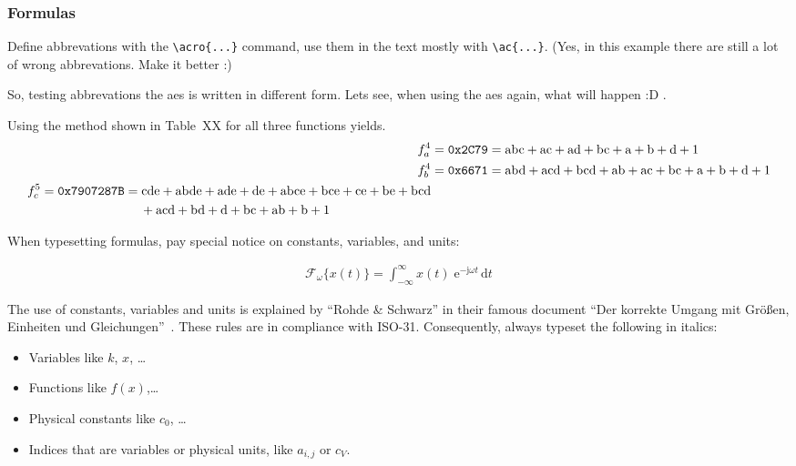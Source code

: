 \subsubsection{Formulas}

Define abbrevations with the \verb+\acro{...}+ command, use them in the text mostly with \verb+\ac{...}+. (Yes, in this example there are still a lot of wrong abbrevations. Make it better :)

So, testing abbrevations the \gls{aes} is written in different form. Lets see, when using the \gls{aes} again, what will happen :D .

Using the method shown in Table~XX for all three functions yields.
\begin{align}
f_a^4 &= \mathrm{\texttt{0x2C79}} = \mathrm{abc} + \mathrm{ac} + \mathrm{ad} + \mathrm{bc} + \mathrm{a} + \mathrm{b} + \mathrm{d} + \mathrm{1} \\
f_b^4 &= \mathrm{\texttt{0x6671}} = \mathrm{abd} + \mathrm{acd} + \mathrm{bcd} + \mathrm{ab} + \mathrm{ac} + \mathrm{bc} + \mathrm{a} + \mathrm{b} + \mathrm{d} + \mathrm{1}\\
\begin{split}
f_c^5 &= \mathrm{\texttt{0x7907287B}} = \mathrm{cde} + \mathrm{abde} + \mathrm{ade} + \mathrm{de} + \mathrm{abce} + \mathrm{bce} + \mathrm{ce} + \mathrm{be} + \mathrm{bcd}\\
&\hspace{2.75cm}+ \mathrm{acd} +\mathrm{bd} + \mathrm{d} + \mathrm{bc} + \mathrm{ab} + \mathrm{b} + \mathrm{1}
\end{split}
\end{align}

When typesetting formulas, pay special notice on constants, variables, and units:

 \begin{align}
  \mathcal{F}_{\omega}\{x(t)\} = \int^{\infty}_{-\infty} x(t) \;\mathrm{e}^{-\mathrm{j} \omega t}\,\mathrm{d}t
  \tag{Fourier-Transformation} %
  \end{align}

The use of constants, variables and units is explained by \enquote{Rohde \& Schwarz} in their famous document \enquote{Der korrekte Umgang mit Gr\"{o}\ss{}en, Einheiten und Gleichungen}~\cite{msc:correctuse}. These rules are in compliance with ISO-31. Consequently, always typeset the following in italics:

\begin{itemize}
\item Variables like $k$, $x$, \dots
\item Functions like $f(x)$,\dots
\item Physical constants like $c_0$, \dots
\item Indices that are variables or physical units, like $a_{i, j}$ or $c_V$.
\end{itemize}

